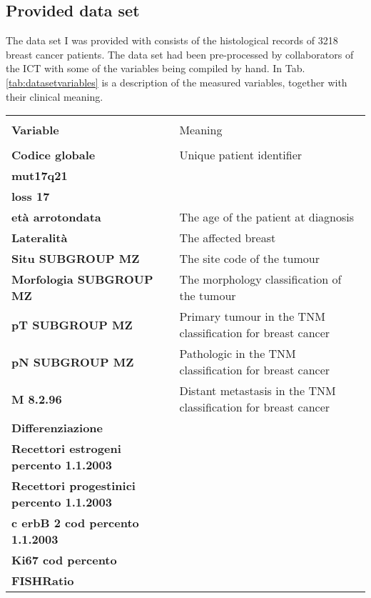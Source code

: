 
\subsection{Provided data set}
The data set I was provided with consists of the histological records of 3218 breast cancer patients.
The data set had been pre-processed by collaborators of the ICT with some of the variables being compiled by hand. 
In Tab. \ref{tab:datasetvariables} is a description of the measured variables, together with their clinical meaning.

\begin{table*}[htbp]
\caption{Data set variables}
\begin{center}
\begin{tabular}{l l}
\hline \\
\textbf{Variable} & Meaning \\
\hline \\
\textbf{Codice globale} & Unique patient identifier \\
\textbf{mut17q21} & \\
\textbf{loss 17} & \\
\textbf{et\`a arrotondata} & The age of the patient at diagnosis\\
\textbf{Lateralit\`a} & The affected breast \\
\textbf{Situ SUBGROUP MZ} & The site code of the tumour \\
\textbf{Morfologia SUBGROUP MZ} & The morphology classification of the tumour \\
\textbf{pT SUBGROUP MZ} & Primary tumour in the TNM classification for breast cancer \\
\textbf{pN SUBGROUP MZ} & Pathologic in the TNM classification for breast cancer \\
\textbf{M 8.2.96} & Distant metastasis in the TNM classification for breast cancer \\
\textbf{Differenziazione} &  \\
\textbf{Recettori estrogeni percento 1.1.2003} & \\
\textbf{Recettori progestinici percento 1.1.2003} & \\
\textbf{c erbB 2  cod percento 1.1.2003} & \\
\textbf{Ki67 cod percento} & \\
\textbf{FISHRatio} & \\
\end{tabular}
\label{tab:datasetvariables}
\end{center}
\end{table*}

